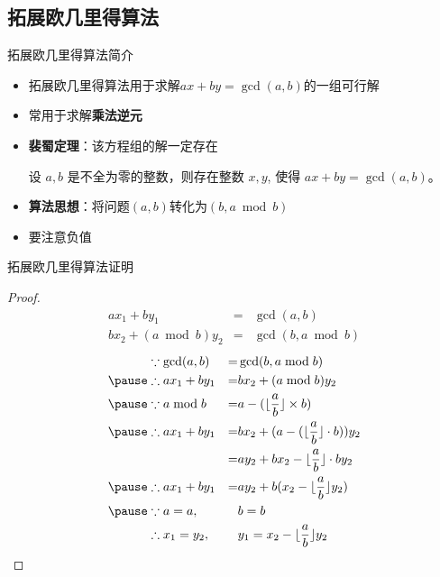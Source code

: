 \subsection{拓展欧几里得算法}
\begin{frame}[fragile]{拓展欧几里得算法}{简介}
  \begin{itemize}
    \item 拓展欧几里得算法用于求解$ax+by=\gcd(a,b)$的一组可行解
    \pause
    \item 常用于求解\textbf{乘法逆元}
    \pause 
    \item \textbf{裴蜀定理}：该方程组的解一定存在
    \begin{theorem}[裴蜀定理]
      设 $a,b$ 是不全为零的整数，则存在整数 $x,y$, 使得 $ax+by=\gcd(a,b)$。      
    \end{theorem}
    \pause
    \item \textbf{算法思想}：将问题$(a,b)$转化为$(b, a\bmod b)$
    \pause
    \item 要注意负值
    
  \end{itemize}
\end{frame}

\begin{frame}[fragile]{拓展欧几里得算法}{证明}
  \begin{proof}
  \pause
$$
\begin{aligned}
  &ax_1+by_1&=&\gcd(a,b)&\\
  &bx_2+(a\bmod b)y_2&=&\gcd(b,a\bmod b)&
\end{aligned}
$$
\pause 
$$
\begin{aligned}
  &\because    \gcd(a,b)   &=& \gcd(b,a\bmod b) \\
  \pause
  &\therefore  ax_1+by_1   &=& bx_2+(a\bmod b)y_2\\
  \pause
  &\because    a\bmod b    &=& a-(\lfloor\frac{a}{b}\rfloor\times b)\\
  \pause 
  &\therefore  ax_1+by_1   &=& bx_2+(a-(\lfloor\frac{a}{b}\rfloor\cdot b))y_2\\
  &                      &=& ay_2+bx_2-\lfloor\frac{a}{b}\rfloor\cdot by_2\\
  \pause 
  &\therefore  ax_1+by_1   &=& ay_2+b(x_2-\lfloor\frac{a}{b}\rfloor y_2)\\
  \pause
  &\because    a=a,&\;&b=b  \\
  &\therefore  x_1=y_2,&\;&y_1=x_2-\lfloor\frac{a}{b}\rfloor y_2\\
\end{aligned}
$$
  \end{proof}
\end{frame}

